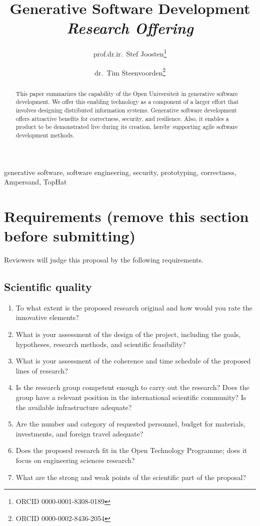 \documentclass{elsarticle}
\begin{document}
% 

\title{Generative Software Development\\{\em\normalsize Research Offering}}
\author{prof.dr.ir.\ Stef Joosten\footnote{ORCID 0000-0001-8308-0189}}
\author{dr.\ Tim Steenvoorden\footnote{ORCID 0000-0002-8436-2054}}
\address{Open Universiteit Nederland, Heerlen, the Netherlands}

\begin{abstract}
    This paper summarizes the capability of the Open Universiteit in generative software development.
    We offer this enabling technology as a component of a larger effort that involves designing distributed information systems.
    Generative software development offers attractive benefits for correctness, security, and resilience.
    Also, it enables a product to be demonstrated live during its creation,
    hereby supporting agile software development methods.
\end{abstract}

\begin{keyword}
    generative software, software engineering, security, prototyping, correctness, Ampersand, TopHat
\end{keyword}
\maketitle

\section{Requirements (remove this section before submitting)}
Reviewers will judge this proposal by the following requirements.
\subsection{Scientific quality}
\begin{enumerate}
   \item 	To what extent is the proposed research original and how would you rate the innovative elements?
   \item 	What is your assessment of the design of the project, including the goals, hypotheses, research methods, and scientific feasibility?
   \item 	What is your assessment of the coherence and time schedule of the proposed lines of research?
   \item 	Is the research group competent enough to carry out the research? Does the group have a relevant position in the international scientific community? Is the available infrastructure adequate?
   \item 	Are the number and category of requested personnel, budget for materials, investments, and foreign travel adequate?
   \item 	Does the proposed research fit in the Open Technology Programme; does it focus on engineering sciences research?
   \item 	What are the strong and weak points of the scientific part of the proposal?   
\end{enumerate}
\end{document}
